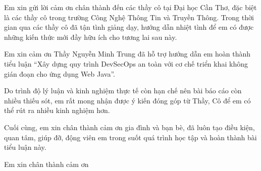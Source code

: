 \documentclass[12pt,a4paper,oneside]{extreport}
\begin{document}
\ctumakecover
\ctumakeinnertitle

\ctufrontmatter

Em xin gửi lời cảm ơn chân thành đến các thầy cô tại Đại học Cần Thơ, đặc biệt
là các thầy cô trong trường Công Nghệ Thông Tin và Truyền Thông. Trong thời
gian qua các thầy cô đã tận tình giảng dạy, hướng dẫn nhiệt tình để em có được
những kiến thức mới đầy hữu ích cho tương lai sau này.

Em xin cảm ơn Thầy Nguyễn Minh Trung đã hỗ trợ hướng dẫn em hoàn thành tiểu
luận ``Xây dựng quy trình DevSecOps an toàn với cơ chế triển khai không gián
đoạn cho ứng dụng Web Java''.

Do trình độ lý luận và kinh nghiệm thực tế còn hạn chế nên bài báo cáo còn
nhiều thiếu sót, em rất mong nhận được ý kiến đóng góp từ Thầy, Cô để em có thể
rút ra nhiều kinh nghiệm hơn.

Cuối cùng, em xin chân thành cảm ơn gia đình và bạn bè, đã luôn tạo điều kiện,
quan tâm, giúp đỡ, động viên em trong suốt quá trình học tập và hoàn thành bài
tiểu luận này.

\begin{flushright}
  Em xin chân thành cảm ơn
\end{flushright}

\ctutableofcontents
\ctulistoffigures
\ctulistoftables
\end{document}
